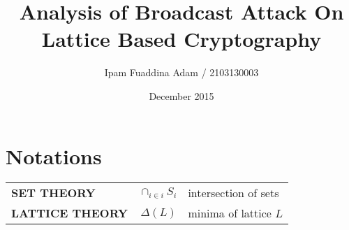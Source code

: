 
\title{Analysis of Broadcast Attack On Lattice Based Cryptography}
\author{Ipam Fuaddina Adam / 2103130003}
\date{December 2015}
\maketitle
\thispagestyle{cleared} %


\clearpage

\tableofcontents
\chapter{Notations}
\begin{tabular}{lrl}
\textbf{\MakeUppercase{SET THEORY}}    & $\cap_{i \in i}S_i$ & intersection of sets\\
\textbf{\MakeUppercase{LATTICE THEORY}}    & $\Delta(L) $ & minima of lattice $L$\\
\end{tabular}

